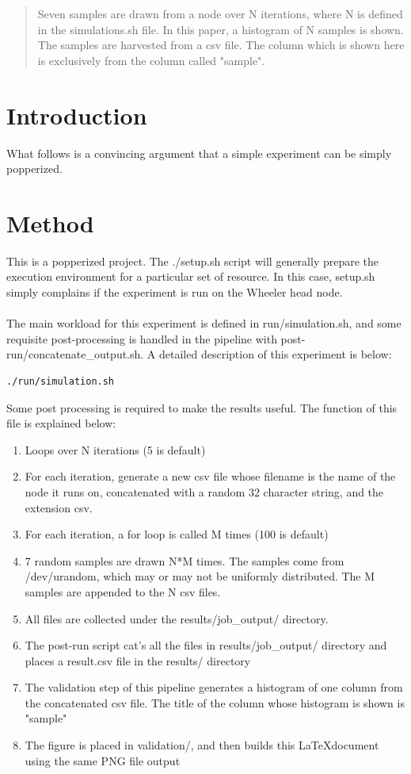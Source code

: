 \documentclass[12pt]{article}
\begin{document}
\maketitle

\begin{abstract}
Seven samples are drawn from a node over N iterations, where N is defined in the simulations.sh file. In this paper, a histogram of N samples is shown. The samples are harvested from a csv file. The column which is shown here is exclusively from the column called "sample".
\end{abstract}

\section*{Introduction}
What follows is a convincing argument that a simple experiment can be simply popperized.
\section*{Method}
This is a popperized project. The ./setup.sh script will generally prepare the execution environment for a particular set of resource. In this case, setup.sh simply complains if the experiment is run on the Wheeler head node. 
\paragraph{}
The main workload for this experiment is defined in run/simulation.sh, and some requisite post-processing is handled in the pipeline with post-run/concatenate\_output.sh. A detailed description of this experiment is below:
\begin{verbatim}
./run/simulation.sh
\end{verbatim}
Some post processing is required to make the results useful.
The function of this file is explained below:
\begin{enumerate}
\item Loops over N iterations (5 is default)
\item For each iteration, generate a new csv file whose filename is the name of the node it runs on, concatenated with a random 32 character string, and the extension csv.
\item For each iteration, a for loop is called M times (100 is default)
\item 7 random samples are drawn N*M times. The samples come from /dev/urandom, which may or may not be uniformly distributed. The M samples are appended to the N csv files.
\item All files are collected under the results/job\_output/ directory.
\item The post-run script cat's all the files in results/job\_output/ directory and places a result.csv file in the results/ directory
\item The validation step of this pipeline generates a histogram of one column from the concatenated csv file. The title of the column whose histogram is shown is "sample"
\item The figure is placed in validation/, and then builds this \LaTeX document using the same PNG file output
\end{enumerate}
\end{document}
